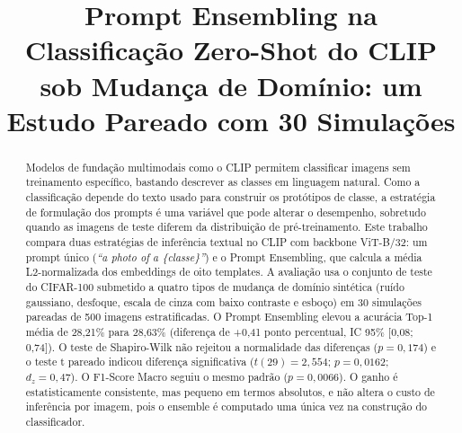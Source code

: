 \documentclass[conference]{IEEEtran}
\begin{document}
\title{Prompt Ensembling na Classificação Zero-Shot do CLIP sob Mudança de Domínio: um Estudo Pareado com 30 Simulações}

\author{
\and
{}
\and
{}
}

\maketitle

\begin{abstract}
Modelos de fundação multimodais como o CLIP permitem classificar imagens sem treinamento específico, bastando descrever as classes em linguagem natural. Como a classificação depende do texto usado para construir os protótipos de classe, a estratégia de formulação dos prompts é uma variável que pode alterar o desempenho, sobretudo quando as imagens de teste diferem da distribuição de pré-treinamento. Este trabalho compara duas estratégias de inferência textual no CLIP com backbone ViT-B/32: um prompt único (\textit{``a photo of a \{classe\}''}) e o Prompt Ensembling, que calcula a média L2-normalizada dos embeddings de oito templates. A avaliação usa o conjunto de teste do CIFAR-100 submetido a quatro tipos de mudança de domínio sintética (ruído gaussiano, desfoque, escala de cinza com baixo contraste e esboço) em 30 simulações pareadas de 500 imagens estratificadas. O Prompt Ensembling elevou a acurácia Top-1 média de 28,21\% para 28,63\% (diferença de +0,41 ponto percentual, IC 95\% [0,08; 0,74]). O teste de Shapiro-Wilk não rejeitou a normalidade das diferenças ($p = 0{,}174$) e o teste t pareado indicou diferença significativa ($t(29) = 2{,}554$; $p = 0{,}0162$; $d_z = 0{,}47$). O F1-Score Macro seguiu o mesmo padrão ($p = 0{,}0066$). O ganho é estatisticamente consistente, mas pequeno em termos absolutos, e não altera o custo de inferência por imagem, pois o ensemble é computado uma única vez na construção do classificador.
\end{abstract}
\end{document}

